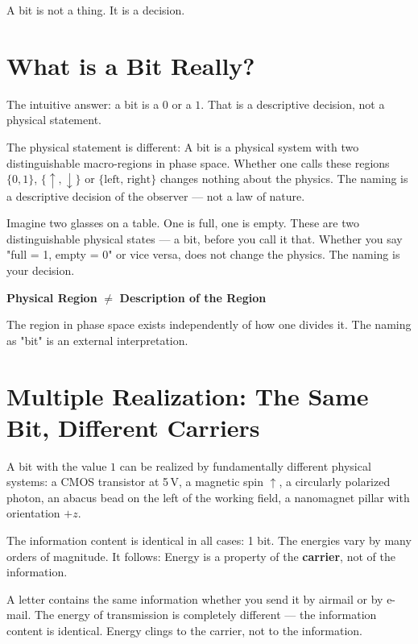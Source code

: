 
\epigraph{A bit is not a thing. It is a decision.}{}

\section{What is a Bit Really?}

The intuitive answer: a bit is a $0$ or a $1$. That is a
descriptive decision, not a physical statement.

The physical statement is different: A bit is a physical
system with two distinguishable macro-regions in phase space. 
Whether one calls these regions $\{0, 1\}$, $\{\uparrow, \downarrow\}$ or
$\{\text{left, right}\}$ changes nothing about the physics. The naming
is a descriptive decision of the observer --- not a law of nature.

\begin{laierspur}
Imagine two glasses on a table. One is full, one is empty.
These are two distinguishable physical states --- a bit,
before you call it that. Whether you say "full = 1, empty = 0" or vice versa,
does not change the physics. The naming is your decision.
\end{laierspur}

\begin{keyresult}
\textbf{Physical Region} $\neq$ \textbf{Description of the Region} 

The region in phase space exists independently of how one divides it.
The naming as "bit" is an external interpretation.
\end{keyresult}

\section{Multiple Realization: The Same Bit, Different Carriers}

A bit with the value $1$ can be realized by fundamentally different physical
systems: a CMOS transistor at 5\,V, a magnetic
spin $\uparrow$, a circularly polarized photon, an abacus bead on the left of the
working field, a nanomagnet pillar with orientation $+z$.

The information content is identical in all cases: 1 bit. The energies
vary by many orders of magnitude. It follows: Energy is a
property of the \textbf{carrier}, not of the information. 

\begin{laierspur}
A letter contains the same information whether you send it by airmail or
by e-mail. The energy of transmission is completely different ---
the information content is identical. Energy clings to the carrier,
not to the information.
\end{laierspur}

